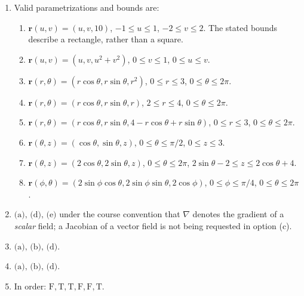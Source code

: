 \documentclass[11pt,letterpaper]{article}
\renewcommand{\vec}[1]{\mathbf{#1}}
\begin{document}
\newpage
\begin{enumerate}[start=36]
\item Valid parametrizations and bounds are:
\begin{enumerate}[label=(\alph*),leftmargin=1.6em,itemsep=3pt]
\item $\vec r(u,v)=(u,v,10)$,
$-1\le u\le1$, $-2\le v\le2$.
The stated bounds describe a rectangle, rather than a square.
\item $\vec r(u,v)=(u,v,u^2+v^2)$,
$0\le v\le1$, $0\le u\le v$.
\item $\vec r(r,\theta)=(r\cos\theta,r\sin\theta,r^2)$,
$0\le r\le3$, $0\le\theta\le2\pi$.
\item $\vec r(r,\theta)=(r\cos\theta,r\sin\theta,r)$,
$2\le r\le4$, $0\le\theta\le2\pi$.
\item $\vec r(r,\theta)=(r\cos\theta,r\sin\theta,
4-r\cos\theta+r\sin\theta)$,
$0\le r\le3$, $0\le\theta\le2\pi$.
\item $\vec r(\theta,z)=(\cos\theta,\sin\theta,z)$,
$0\le\theta\le\pi/2$, $0\le z\le3$.
\item $\vec r(\theta,z)=(2\cos\theta,2\sin\theta,z)$,
$0\le\theta\le2\pi$,
$2\sin\theta-2\le z\le2\cos\theta+4$.
\item $\vec r(\phi,\theta)=(2\sin\phi\cos\theta,
2\sin\phi\sin\theta,2\cos\phi)$,
$0\le\phi\le\pi/4$, $0\le\theta\le2\pi$.
\end{enumerate}

\item $\boxed{\text{(a), (d), (e)}}$ under the course convention that
$\nabla$ denotes the gradient of a \emph{scalar} field; a Jacobian of
a vector field is not being requested in option (c).

\item $\boxed{\text{(a), (b), (d)}}$.
\item $\boxed{\text{(a), (b), (d)}}$.
\item In order: $\boxed{\mathrm{F},\mathrm{T},\mathrm{T},\mathrm{F},\mathrm{F},\mathrm{T}}$.


\end{enumerate}
\end{document}
